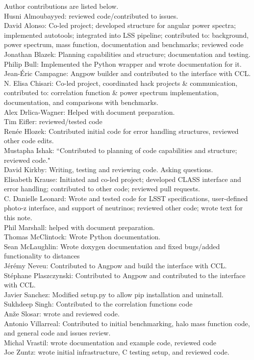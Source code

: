 Author contributions are listed below. \\
Husni Almoubayyed: reviewed code/contributed to issues. \\
David Alonso: Co-led project; developed structure for angular power spectra; implemented autotools; integrated into LSS pipeline; contributed to: background, power spectrum, mass function, documentation and benchmarks; reviewed code \\
Jonathan Blazek: Planning capabilities and structure; documentation and testing. \\
Philip Bull: Implemented the Python wrapper and wrote documentation for it. \\
Jean-\'Eric Campagne: Angpow builder and contributed to the interface with CCL. \\
N. Elisa Chisari: Co-led project, coordinated hack projects \& communication, contributed to: correlation function \& power spectrum implementation, documentation, and comparisons with benchmarks. \\
Alex Drlica-Wagner: Helped with document preparation. \\
Tim Eifler: reviewed/tested code \\
Ren\'ee Hlozek: Contributed initial code for error handling structures, reviewed other code edits. \\
Mustapha Ishak: “Contributed to planning of code capabilities and structure; reviewed code." \\
David Kirkby: Writing, testing and reviewing code. Asking questions. \\
Elisabeth Krause: Initiated and co-led project; developed CLASS interface and error handling; contributed to other code; reviewed pull requests. \\
C. Danielle Leonard: Wrote and tested code for LSST specifications, user-defined photo-z interface, and support of neutrinos; reviewed other code; wrote text for this note. \\
Phil Marshall: helped with document preparation. \\
Thomas McClintock: Wrote Python documentation. \\
Sean McLaughlin: Wrote doxygen documentation and fixed bugs/added functionality to distances \\
J\'er\'emy Neveu: Contributed to Angpow and build the interface with CCL. \\
St\'ephane Plaszczynski: Contributed to Angpow and contributed to the interface with CCL. \\
Javier Sanchez: Modified setup.py to allow pip installation and uninstall. \\
Sukhdeep Singh: Contributed to the correlation functions code \\
An\v{z}e Slosar: wrote and reviewed code. \\
Antonio Villarreal: Contributed to initial benchmarking, halo mass function code, and general code and issues review. \\
Michal Vrastil: wrote documentation and example code, reviewed code \\
Joe Zuntz: wrote initial infrastructure, C testing setup, and reviewed code. \\
